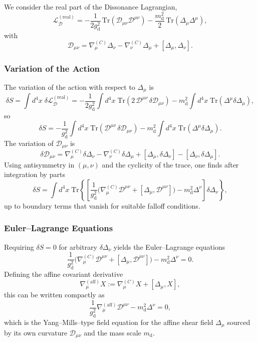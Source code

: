 \documentclass[12pt,openany]{book}
\theoremstyle{plain}
\theoremstyle{definition}
\theoremstyle{remark}
\begin{document}
We consider the real part of the Dissonance Lagrangian,
\[
\mathcal{L}_{\mathcal{D}}^{(\mathrm{real})}
=
-\frac{1}{2 g_{\mathrm{d}}^{2}}
\,\mathrm{Tr}\!\left(\mathcal{D}_{\mu\nu}\mathcal{D}^{\mu\nu}\right)
-\frac{m_{\mathrm{d}}^{2}}{2}
\,\mathrm{Tr}\!\left(\Delta_\mu \Delta^\mu\right),
\]
with
\[
\mathcal{D}_{\mu\nu}
= \nabla_\mu^{(C)} \Delta_\nu
- \nabla_\nu^{(C)} \Delta_\mu
+ [\Delta_\mu,\Delta_\nu].
\]
\subsubsection*{Variation of the Action}

The variation of the action with respect to $\Delta_\mu$ is
\[
\delta S
= \int d^4x\;
\delta \mathcal{L}_{\mathcal{D}}^{(\mathrm{real})}
= -\frac{1}{2 g_{\mathrm{d}}^{2}}
\int d^4x\;
\mathrm{Tr}\!\left(2\,\mathcal{D}^{\mu\nu}\,\delta\mathcal{D}_{\mu\nu}\right)
- m_{\mathrm{d}}^{2}
\int d^4x\;
\mathrm{Tr}\!\left(\Delta^\mu \delta\Delta_\mu\right),
\]
so
\[
\delta S
= -\frac{1}{g_{\mathrm{d}}^{2}}
\int d^4x\;
\mathrm{Tr}\!\left(\mathcal{D}^{\mu\nu}\,\delta\mathcal{D}_{\mu\nu}\right)
- m_{\mathrm{d}}^{2}
\int d^4x\;
\mathrm{Tr}\!\left(\Delta^\mu \delta\Delta_\mu\right).
\]
The variation of $\mathcal{D}_{\mu\nu}$ is
\[
\delta\mathcal{D}_{\mu\nu}
= \nabla_\mu^{(C)} \delta\Delta_\nu
- \nabla_\nu^{(C)} \delta\Delta_\mu
+ [\Delta_\mu,\delta\Delta_\nu]
- [\Delta_\nu,\delta\Delta_\mu].
\]
Using antisymmetry in $(\mu,\nu)$ and the cyclicity of the trace, one finds
after integration by parts
\[
\delta S
= \int d^4x\;
\mathrm{Tr}\!\left\{
\left[
\frac{1}{g_{\mathrm{d}}^{2}}
\Big(\nabla_\mu^{(C)}\mathcal{D}^{\mu\nu}
+ [\Delta_\mu,\mathcal{D}^{\mu\nu}]\Big)
- m_{\mathrm{d}}^{2}\Delta^\nu
\right]
\delta\Delta_\nu
\right\},
\]
up to boundary terms that vanish for suitable falloff conditions.

\subsubsection*{Euler--Lagrange Equations}

Requiring $\delta S = 0$ for arbitrary $\delta\Delta_\nu$ yields the
Euler--Lagrange equations
\[
\frac{1}{g_{\mathrm{d}}^{2}}
\Big(\nabla_\mu^{(C)}\mathcal{D}^{\mu\nu}
+ [\Delta_\mu,\mathcal{D}^{\mu\nu}]\Big)
- m_{\mathrm{d}}^{2}\Delta^\nu
= 0.
\]
Defining the affine covariant derivative
\[
\nabla_\mu^{(\mathrm{aff})} X
:= \nabla_\mu^{(C)} X + [\Delta_\mu,X],
\]
this can be written compactly as
\[
\boxed{
\frac{1}{g_{\mathrm{d}}^{2}}
\nabla_\mu^{(\mathrm{aff})}\mathcal{D}^{\mu\nu}
- m_{\mathrm{d}}^{2}\Delta^\nu
= 0,
}
\]
which is the Yang--Mills–type field equation for the affine shear field
$\Delta_\mu$ sourced by its own curvature $\mathcal{D}_{\mu\nu}$ and the
mass scale $m_{\mathrm{d}}$.
\end{document}
